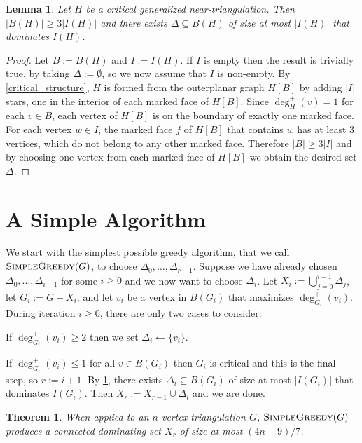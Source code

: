 \documentclass[a4paper,UKenglish,cleveref, autoref, thm-restate]{lipics-v2021}
\newtheorem{thm}{Theorem}
\newtheorem{lem}{Lemma}
\begin{document}
\begin{lem}\label{base_case}
    Let $H$ be a critical generalized near-triangulation. Then $|B(H)|\ge 3|I(H)|$ and there exists $\Delta\subseteq B(H)$ of size at most $|I(H)|$ that dominates $I(H)$.
\end{lem}

\begin{proof}
  Let $B:=B(H)$ and $I:=I(H)$.  If $I$ is empty then the result is trivially true, by taking $\Delta:=\emptyset$, so we now assume that $I$ is non-empty.  By \cref{critical_structure}, $H$ is formed from the outerplanar graph $H[B]$ by adding $|I|$ stars, one in the interior of each marked face of $H[B]$.  Since $\deg_H^+(v)=1$ for each $v\in B$, each vertex of $H[B]$ is on the boundary of exactly one marked face.  For each vertex $w\in I$, the marked face $f$ of $H[B]$ that contains $w$ has at least $3$ vertices, which do not belong to any other marked face. Therefore $|B|\ge 3|I|$ and by choosing one vertex from each marked face of $H[B]$ we obtain the desired set $\Delta$.
\end{proof}


\section{A Simple Algorithm}
\label{warm_up}

We start with the simplest possible greedy algorithm, that we call $\textsc{SimpleGreedy}(G)$, to choose $\Delta_0,\ldots,\Delta_{r-1}$.  Suppose we have already chosen $\Delta_0,\ldots,\Delta_{i-1}$ for some $i\ge 0$ and we now want to choose $\Delta_i$.  Let $X_i:=\bigcup_{j=0}^{i-1}\Delta_j$, let $G_i:=G-X_i$, and let $v_i$ be a vertex in $B(G_i)$ that maximizes $\deg^+_{G_i}(v_i)$.  During iteration $i\ge 0$, there are only two cases to consider:
\begin{compactenum}[{[}g1{]}]
    \item If $\deg^+_{G_i}(v_i)\ge 2$ then we set $\Delta_i\gets\{v_i\}$.
    \item If $\deg^+_{G_i}(v_i)\le 1$ for all $v\in B(G_i)$ then $G_i$ is critical and this is the final step, so $r:=i+1$.  By \cref{base_case}, there exists $\Delta_i\subseteq B(G_i)$ of size at most $|I(G_i)|$ that dominates $I(G_i)$. Then $X_r:=X_{r-1}\cup\Delta_{i}$ and we are done.
\end{compactenum}

\begin{thm}\label{simple_greedy}
  When applied to an $n$-vertex triangulation $G$,  $\textsc{SimpleGreedy}(G)$ produces a connected dominating set $X_r$ of size at most $(4n-9)/7$.
\end{thm}
\end{document}
